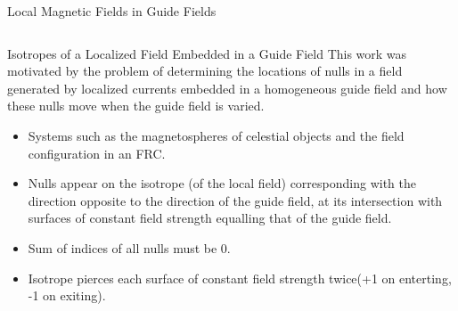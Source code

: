 \documentclass[final]{beamer}
\newlength{\onecolwid}
\newlength{\twocolwid}
\begin{document}
\begin{frame}[t]
\begin{columns}[t]
\begin{column}{\twocolwid}
\begin{block}{\huge{Local Magnetic Fields in Guide Fields}}
\begin{columns}[t,totalwidth=\twocolwid]
\begin{column}{\onecolwid}
\begin{block}{Isotropes of a Localized Field Embedded in a Guide Field}
  This work was motivated by the problem of determining the locations of nulls in a field generated by
  localized currents embedded in a homogeneous guide field
  and how these nulls move when the guide field is varied.
  \begin{itemize}
    \item Systems such as the magnetospheres of celestial objects and the field configuration in an FRC.
    \item Nulls appear on the isotrope (of the local field) corresponding with the direction opposite to the
      direction of the guide field,
      at its intersection with surfaces of constant field strength equalling that of the guide field.
    \item Sum of indices of all nulls must be 0.
    \item Isotrope pierces each surface of constant field strength twice(+1 on enterting, -1 on exiting).
   \end{itemize}
    

\end{block}
\end{column}
\end{columns}
\end{block}
\end{column}
\end{columns}
\end{frame}
\end{document}
